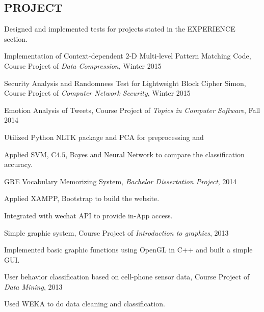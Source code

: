 \documentclass{res}
\newcommand{\additemindent}{\addtolength{\itemindent}{1em}}
\begin{document}
\begin{resume}
\section{PROJECT}
\begin{asparaenum}

	\item Designed and implemented tests for projects stated in the EXPERIENCE section.

	\item Implementation of Context-dependent $2$-D Multi-level Pattern Matching Code, Course Project of \emph{Data Compression}, Winter 2015

	\item Security Analysis and Randomness Test for Lightweight Block Cipher Simon, Course Project of \emph{Computer Network Security}, Winter 2015

	\item Emotion Analysis of Tweets, Course Project of \emph{Topics in Computer Software}, Fall 2014
		\begin{asparaitem}
			\additemindent
			\item Utilized Python NLTK package and PCA for preprocessing and 
			\item Applied SVM, C$4.5$, Bayes and Neural Network to compare the classification accuracy.
		\end{asparaitem}

	\item GRE Vocabulary Memorizing System, \emph{Bachelor Dissertation Project}, 2014
		\begin{asparaitem}
			\additemindent
			\item Applied XAMPP, Bootstrap to build the website.
			\item Integrated with wechat API to provide in-App access.
		\end{asparaitem}

	\item Simple graphic system, Course Project of \emph{Introduction to graphics}, 2013
		\begin{asparaitem}
			\additemindent
			\item Implemented basic graphic functions using OpenGL in C++ and built a simple GUI. 
		\end{asparaitem}

	
 	\item User behavior classification based on cell-phone sensor data, Course Project of \emph{Data Mining}, 2013
 		\begin{asparaitem}
			\additemindent
			\item Used WEKA to do data cleaning and classification. 
		\end{asparaitem}


\end{asparaenum}
\end{resume}
\end{document}
